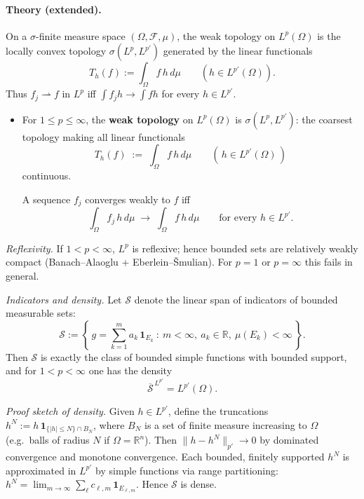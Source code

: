 \documentclass[12pt,a4paper]{article}
\theoremstyle{plain}
\theoremstyle{definition}
\theoremstyle{remark}
\theoremstyle{remark}
\theoremstyle{definition}
\begin{document}
	\paragraph{Theory (extended).}
	On a $\sigma$-finite measure space $(\Omega,\mathcal F,\mu)$, the weak topology on $L^{p}(\Omega)$
	is the locally convex topology $\sigma(L^{p},L^{p'})$ generated by the linear functionals
	\[
	T_h(f) := \int_\Omega f\,h\,d\mu \qquad (h\in L^{p'}(\Omega)).
	\]
	Thus $f_j \rightharpoonup f$ in $L^{p}$ iff $\int f_j h \to \int f h$ for every $h\in L^{p'}$.
	
	
	\begin{itemize}
		\item For $1\le p\le\infty$, the \textbf{weak topology} on $L^{p}(\Omega)$ is 
		$\sigma(L^{p},L^{p'})$: the coarsest topology making all linear functionals
		\[
		T_h(f)\;:=\;\int_{\Omega} f\,h\,d\mu 
		\qquad (\,h\in L^{p'}(\Omega)\,)
		\]
		continuous.
		
		\vspace{0.25em}
		A sequence $f_j$ converges weakly to $f$ iff
		\[
		\int_{\Omega} f_j\,h\,d\mu \;\longrightarrow\; \int_{\Omega} f\,h\,d\mu
		\qquad \text{for every } h\in L^{p'}.
		\]
	\end{itemize}
	
	\medskip
	\noindent\emph{Reflexivity.}
	If $1<p<\infty$, $L^{p}$ is reflexive; hence bounded sets are relatively weakly compact
	(Banach--Alaoglu + Eberlein--\v{S}mulian). For $p=1$ or $p=\infty$ this fails in general.
	
	\medskip
	\noindent\emph{Indicators and density.}
	Let $\mathcal S$ denote the linear span of indicators of bounded measurable sets:
	\[
	\mathcal S := \left\{\, g=\sum_{k=1}^{m} a_k\,\mathbf 1_{E_k}\ :\ m<\infty,\ a_k\in\mathbb R,\ \mu(E_k)<\infty \,\right\}.
	\]
	Then $\mathcal S$ is exactly the class of bounded simple functions with bounded support,
	and for $1<p<\infty$ one has the density
	\[
	\overline{\mathcal S}^{\,L^{p'}} = L^{p'}(\Omega).
	\]
	
	\noindent\emph{Proof sketch of density.}
	Given $h\in L^{p'}$, define the truncations $h^N := h\,\mathbf 1_{\{|h|\le N\}\cap B_N}$,
	where $B_N$ is a set of finite measure increasing to $\Omega$ (e.g.\ balls of radius $N$ if $\Omega=\mathbb R^n$).
	Then $\|h-h^N\|_{p'}\to0$ by dominated convergence and monotone convergence.
	Each bounded, finitely supported $h^N$ is approximated in $L^{p'}$ by simple functions via range partitioning:
	$h^N=\lim_{m\to\infty}\sum_\ell c_{\ell,m}\,\mathbf 1_{E_{\ell,m}}$.
	Hence $\mathcal S$ is dense.
	
\end{document}
